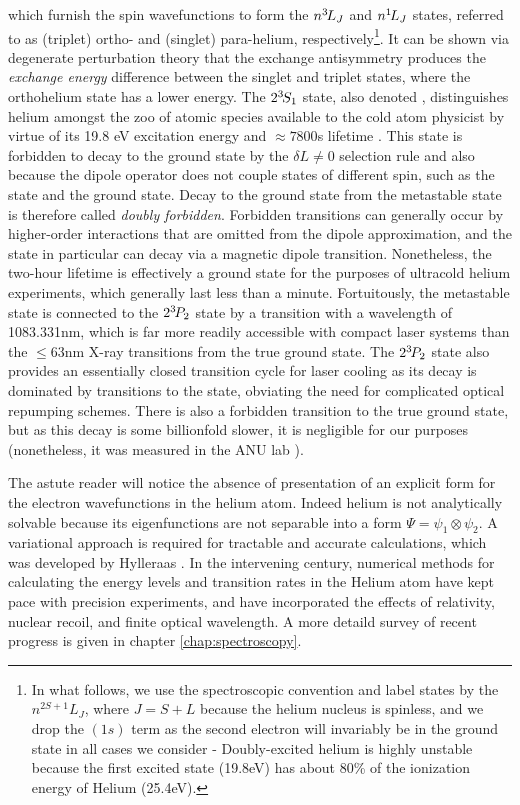 	which furnish the spin wavefunctions to form the $n^{3\!} L_{J}$ and $n^{1\!} L_{J}$ states, referred to as (triplet) ortho- and (singlet) para-helium, respectively\footnote{In what follows, we use the spectroscopic convention and label states by the $n^{2S+1}L_J$, where $J=S+L$ because the helium nucleus is spinless, and we drop the $(1s)$ term as the second electron will invariably be in the ground state in all cases we consider -  Doubly-excited helium is highly unstable because the first excited state (19.8eV) has about 80\% of the ionization energy of Helium (25.4eV).}.
	It can be shown via degenerate perturbation theory that the exchange antisymmetry produces the \emph{exchange energy} difference between the singlet and triplet states, where the  orthohelium state has a lower energy.
	 The $2^{3\!}S_1$ state, also denoted \mhe, distinguishes helium amongst the zoo of atomic species available to the cold atom physicist by virtue of its 19.8 eV excitation energy and $\approx 7800$s lifetime \cite{hodgman09}.
	 This state is forbidden to decay to the ground state by the $\delta L\neq0$ selection rule and also because the dipole operator does not couple states of different spin, such as the \mhe state and the ground state.
	Decay to the ground state from the metastable state is  therefore called \emph{doubly forbidden}.
	Forbidden transitions can generally occur by higher-order interactions that are omitted from the dipole approximation, and the \mhe state in particular can decay via a magnetic dipole transition.
	Nonetheless, the two-hour lifetime is effectively a ground state for the purposes of ultracold helium experiments, which generally last less than a minute.
	Fortuitously, the metastable state is connected to the $2^{3\!} P_2$ state by a transition with a wavelength of 1083.331nm, which is far more readily accessible with compact laser systems than the $\leq 63$nm X-ray transitions from the true ground state.
	The $2^{3\!} P_2$ state also provides an essentially closed transition cycle for laser cooling as its decay is dominated by transitions to the \mhe state, obviating the need for complicated optical repumping schemes.
	There is also a forbidden transition to the true ground state, but as this decay is some billionfold slower, it is negligible for our purposes (nonetheless, it was measured in the ANU lab \cite{Hodgman09_23P}).

	The astute reader will notice the absence of presentation of an explicit form for the electron wavefunctions in the helium atom.
	Indeed	helium is not analytically solvable because its eigenfunctions are not separable into a form $\Psi = \psi_1\otimes\psi_2$.
	A variational approach is required for tractable and accurate calculations, which was developed by Hylleraas \cite{Hylleraas1920,Hylleraas1929,Hylleraas1930}.
	In the intervening century, numerical methods for calculating the energy levels and transition rates in the Helium atom have kept pace with precision experiments, and have incorporated the effects of relativity, nuclear recoil, and finite optical wavelength. A more detaild survey of recent progress is given in chapter \ref{chap:spectroscopy}.


